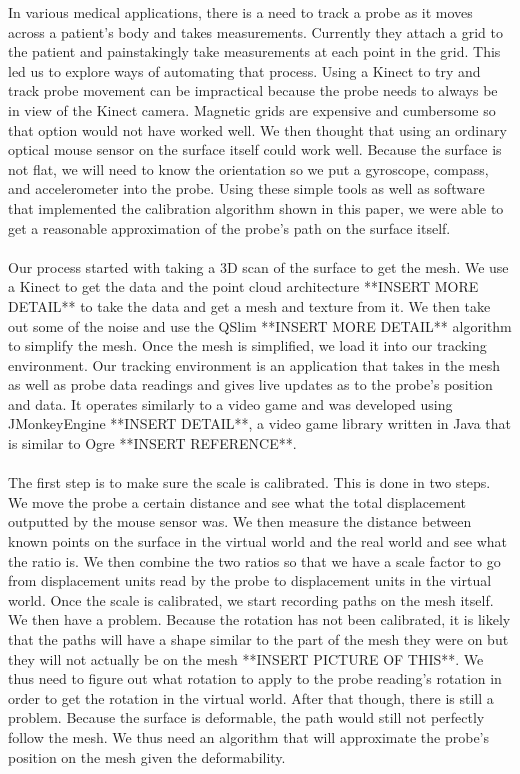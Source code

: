 \documentclass[11pt,psfig]{article}
\begin{document}
In various medical applications, there is a need to track a probe as it moves across a patient's body and takes measurements. Currently they attach a grid to the patient and painstakingly take measurements at each point in the grid. This led us to explore ways of automating that process. Using a Kinect to try and track probe movement can be impractical because the probe needs to always be in view of the Kinect camera. Magnetic grids are expensive and cumbersome so that option would not have worked well. We then thought that using an ordinary optical mouse sensor on the surface itself could work well. Because the surface is not flat, we will need to know the orientation so we put a gyroscope, compass, and accelerometer into the probe. Using these simple tools as well as software that implemented the calibration algorithm shown in this paper, we were able to get a reasonable approximation of the probe's path on the surface itself.\\
\\
Our process started with taking a 3D scan of the surface to get the mesh. We use a Kinect to get the data and the point cloud architecture **INSERT MORE DETAIL** to take the data and get a mesh and texture from it. We then take out some of the noise and use the QSlim **INSERT MORE DETAIL** algorithm to simplify the mesh. Once the mesh is simplified, we load it into our tracking environment. Our tracking environment is an application that takes in the mesh as well as probe data readings and gives live updates as to the probe's position and data. It operates similarly to a video game and was developed using JMonkeyEngine **INSERT DETAIL**, a video game library written in Java that is similar to Ogre **INSERT REFERENCE**. \\
\\
The first step is to make sure the scale is calibrated. This is done in two steps. We move the probe a certain distance and see what the total displacement outputted by the mouse sensor was. We then measure the distance between known points on the surface in the virtual world and the real world and see what the ratio is. We then combine the two ratios so that we have a scale factor to go from displacement units read by the probe to displacement units in the virtual world. Once the scale is calibrated, we start recording paths on the mesh itself. We then have a problem. Because the rotation has not been calibrated, it is likely that the paths will have a shape similar to the part of the mesh they were on but they will not actually be on the mesh **INSERT PICTURE OF THIS**. We thus need to figure out what rotation to apply to the probe reading's rotation in order to get the rotation in the virtual world. After that though, there is still a problem. Because the surface is deformable, the path would still not perfectly follow the mesh. We thus need an algorithm that will approximate the probe's position on the mesh given the deformability. \\
\end{document}
